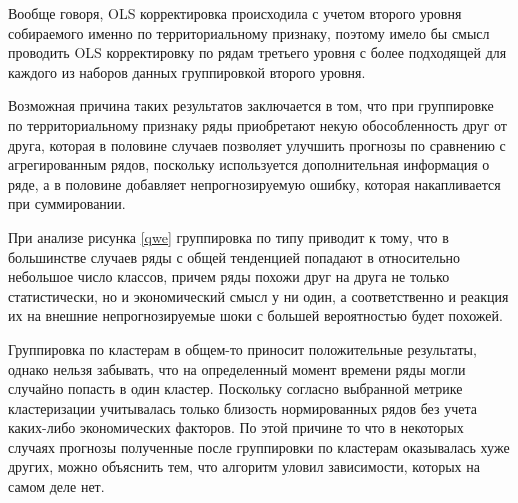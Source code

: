 \documentclass[12pt,a4paper, oneside]{extreport}
\begin{document}
Вообще говоря, OLS корректировка происходила с учетом второго уровня собираемого именно по территориальному признаку, поэтому имело бы смысл проводить OLS корректировку по  рядам третьего уровня с более подходящей  для каждого из наборов данных группировкой второго уровня. 


Возможная причина таких результатов заключается в том, что при группировке по территориальному признаку ряды приобретают 
некую обособленность друг от друга, которая в половине случаев позволяет улучшить прогнозы по сравнению с агрегированным рядов, поскольку используется дополнительная информация о ряде, а в половине добавляет непрогнозируемую ошибку, которая накапливается при суммировании. 

При анализе рисунка \ref{qwe} группировка по типу приводит к тому, что в большинстве случаев ряды с общей тенденцией попадают в относительно небольшое число классов, причем ряды похожи друг на друга не только статистически, но и экономический смысл у ни один, а соответственно и реакция их на внешние непрогнозируемые шоки с большей вероятностью будет похожей. 

Группировка по кластерам в общем-то приносит положительные результаты, однако нельзя забывать, что на определенный момент времени ряды могли случайно попасть в один кластер. Поскольку согласно выбранной метрике кластеризации учитывалась только близость нормированных рядов без учета каких-либо экономических факторов. По этой причине то что  в некоторых случаях  прогнозы полученные после группировки по кластерам оказывалась хуже других, можно объяснить  тем, что  алгоритм  уловил зависимости, которых на самом деле нет.  
\end{document}
